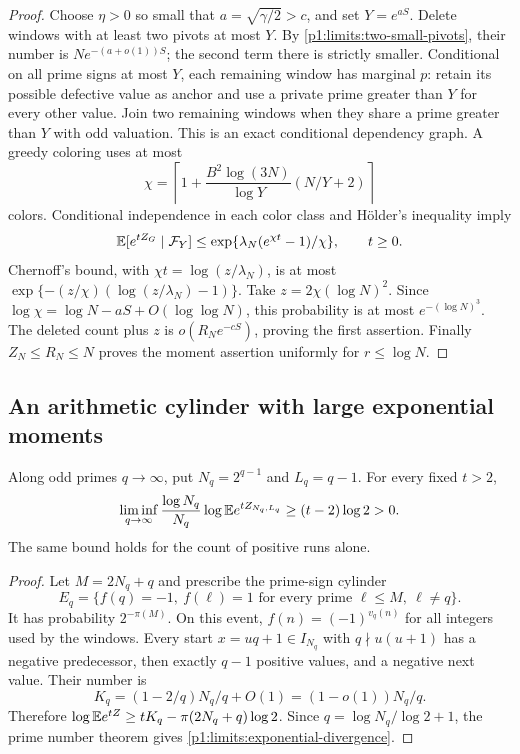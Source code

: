 \begin{proof}
Choose $\eta>0$ so small that
$a=\sqrt{\gamma/2}>c$, and set $Y=e^{aS}$.
Delete windows with at least two pivots at most $Y$.
By \eqref{p1:limits:two-small-pivots}, their number is
$N e^{-(a+o(1))S}$; the second term there is strictly smaller.
Conditional on all prime signs at most $Y$, each remaining
window has marginal $p$: retain its possible defective value
as anchor and use a private prime greater than $Y$ for every
other value.  Join two remaining windows when they share a
prime greater than $Y$ with odd valuation.  This is an exact
conditional dependency graph.  A greedy coloring uses at most
\[
 \chi=\left\lceil1+\frac{B^2\log(3N)}{\log Y}(N/Y+2)\right\rceil
\]
colors.  Conditional independence in each color class and
H\"older's inequality imply
\[
 \mathbb E[e^{tZ_G}\mid\mathcal F_Y]
       \le\exp\{\lambda_N(e^{\chi t}-1)/\chi\},\qquad t\ge0.
\]
Chernoff's bound, with $\chi t=\log(z/\lambda_N)$, is at most
$\exp\{-(z/\chi)(\log(z/\lambda_N)-1)\}$.
Take $z=2\chi(\log N)^2$.  Since
$\log\chi=\log N-aS+O(\log\log N)$, this probability is
at most $e^{-(\log N)^3}$.  The deleted count plus $z$ is
$o(R_Ne^{-cS})$, proving the first assertion.  Finally
$Z_N\le R_N\le N$ proves the moment assertion uniformly for
$r\le\log N$.
\end{proof}

\subsection{An arithmetic cylinder with large exponential moments}

\begin{proposition}
\label{p1:limits:cylinder}
Along odd primes $q\to\infty$, put $N_q=2^{q-1}$ and
$L_q=q-1$.  For every fixed $t>2$,
\begin{equation}
 \liminf_{q\to\infty}\frac{\log N_q}{N_q}
        \log\mathbb E e^{tZ_{N_q,L_q}}\ge(t-2)\log2>0.
 \label{p1:limits:exponential-divergence}
\end{equation}
The same bound holds for the count of positive runs alone.
\end{proposition}
\begin{proof}
Let $M=2N_q+q$ and prescribe the prime-sign cylinder
\[
 E_q=\{f(q)=-1,\ f(\ell)=1
             \text{ for every prime }\ell\le M,\ \ell\ne q\}.
\]
It has probability $2^{-\pi(M)}$.  On this event,
$f(n)=(-1)^{v_q(n)}$ for all integers used by the windows.
Every start $x=uq+1\in I_{N_q}$ with $q\nmid u(u+1)$ has a
negative predecessor, then exactly $q-1$ positive values, and
a negative next value.  Their number is
\[
 K_q=(1-2/q)N_q/q+O(1)=(1-o(1))N_q/q.
\]
Therefore
$\log\mathbb E e^{tZ}\ge tK_q-\pi(2N_q+q)\log2$.
Since $q=\log N_q/\log2+1$, the prime number theorem gives
\eqref{p1:limits:exponential-divergence}.
\end{proof}


